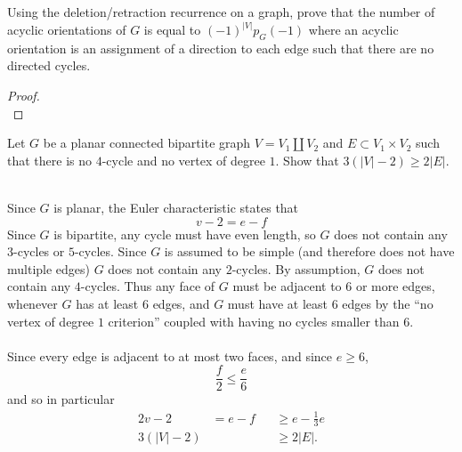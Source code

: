 \documentclass{article}
\newenvironment{problem}[2][Problem]{\begin{trivlist}
\item[\hskip \labelsep {\bfseries #1}\hskip \labelsep {\bfseries #2.}]}{\end{trivlist}}
\newenvironment{solution}[1][Solution.]{\begin{trivlist}
\item[\hskip \labelsep {\bfseries #1}]}{\end{trivlist}}
\begin{document}
\pagebreak
\begin{problem}{3}
  Using the deletion/retraction recurrence on a graph, prove that the number of
  acyclic orientations of $G$ is equal to $(-1)^{|V|}p_G(-1)$ where an acyclic
  orientation is an assignment of a direction to each edge such that there are
  no directed cycles.
\end{problem}

\begin{proof} \text{} \\
\end{proof}
\pagebreak
\begin{problem}{4}
  Let $G$ be a planar connected bipartite graph $V = V_1 \coprod V_2$ and
  $E \subset V_1 \times V_2$ such that there is no $4$-cycle and no vertex of
  degree $1$. Show that $3(|V|-2) \geq 2|E|$.
\end{problem}

\begin{solution} \text{} \\
  Since $G$ is planar, the Euler characteristic states that \[
    v - 2 = e - f
  \]
  Since $G$ is bipartite, any cycle must have even length, so $G$ does not
  contain any $3$-cycles or $5$-cycles. Since $G$ is
  assumed to be simple (and therefore does not have multiple edges) $G$ does
  not contain any $2$-cycles. By assumption, $G$ does not contain any $4$-cycles.
  Thus any face of $G$ must be adjacent to $6$ or more edges, whenever $G$ has
  at least $6$ edges, and $G$ must have at least $6$ edges by the ``no vertex of
  degree $1$ criterion'' coupled with having no cycles smaller than $6$.
  \\~\\
  Since every edge is adjacent to at most two faces, and since $e \geq 6$, \[
    \frac f2 \leq \frac e6
  \] and so in particular \begin{alignat*}{2}
    v - 2 &= e - f &&\geq e - \frac 13e \\
    3(|V| - 2)& &&\geq 2|E|.
  \end{alignat*}
\end{solution}
\end{document}
